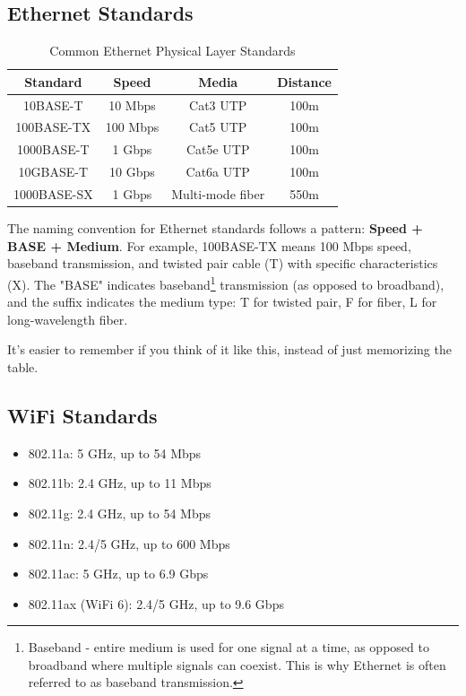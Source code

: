 \subsection*{Ethernet Standards}
\begin{table}[h]
    \centering
    \begin{tabular}{|c|c|c|c|}
        \hline
        \textbf{Standard} & \textbf{Speed} & \textbf{Media} & \textbf{Distance} \\
        \hline
        10BASE-T & 10 Mbps & Cat3 UTP & 100m \\
        100BASE-TX & 100 Mbps & Cat5 UTP & 100m \\
        1000BASE-T & 1 Gbps & Cat5e UTP & 100m \\
        10GBASE-T & 10 Gbps & Cat6a UTP & 100m \\
        1000BASE-SX & 1 Gbps & Multi-mode fiber & 550m \\
        \hline
    \end{tabular}
    \caption{Common Ethernet Physical Layer Standards}\label{tab:ethernet_standards}
\end{table}

\begin{tipblock}
    The naming convention for Ethernet standards follows a pattern: \textbf{Speed + BASE + Medium}. For example, 100BASE-TX means 100 Mbps speed, baseband transmission, and twisted pair cable (T) with specific characteristics (X). The "BASE" indicates baseband\footnote{
        Baseband - entire medium is used for one signal at a time, as opposed to broadband where multiple signals can coexist. This is why Ethernet is often referred to as baseband transmission.
    } transmission (as opposed to broadband), and the suffix indicates the medium type: T for twisted pair, F for fiber, L for long-wavelength fiber.

    It's easier to remember if you think of it like this, instead of just memorizing the table.
\end{tipblock}


\subsection*{WiFi Standards}
\begin{itemize}
    \item 802.11a: 5 GHz, up to 54 Mbps
    \item 802.11b: 2.4 GHz, up to 11 Mbps
    \item 802.11g: 2.4 GHz, up to 54 Mbps
    \item 802.11n: 2.4/5 GHz, up to 600 Mbps
    \item 802.11ac: 5 GHz, up to 6.9 Gbps
    \item 802.11ax (WiFi 6): 2.4/5 GHz, up to 9.6 Gbps
\end{itemize}

